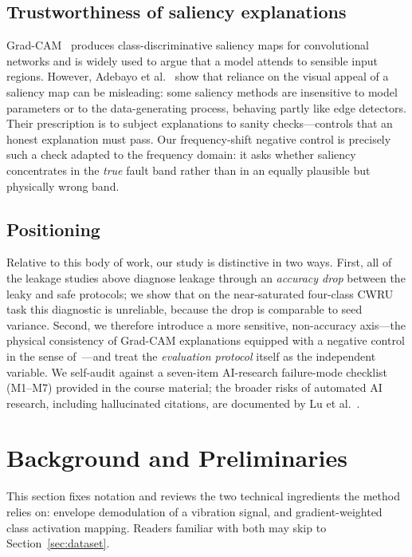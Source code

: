 \documentclass[11pt]{article}
\begin{document}
\subsection{Trustworthiness of saliency explanations}
Grad-CAM~\cite{selvaraju2017gradcam} produces class-discriminative saliency maps for
convolutional networks and is widely used to argue that a model attends to sensible input
regions. However, Adebayo et al.~\cite{adebayo2018sanity} show that reliance on the
visual appeal of a saliency map can be misleading: some saliency methods are insensitive
to model parameters or to the data-generating process, behaving partly like edge
detectors. Their prescription is to subject explanations to sanity checks---controls that
an honest explanation must pass. Our frequency-shift negative control is precisely such a
check adapted to the frequency domain: it asks whether saliency concentrates in the
\emph{true} fault band rather than in an equally plausible but physically wrong band.

\subsection{Positioning}
Relative to this body of work, our study is distinctive in two ways. First, all of the
leakage studies above diagnose leakage through an \emph{accuracy drop} between the leaky
and safe protocols; we show that on the near-saturated four-class CWRU task this
diagnostic is unreliable, because the drop is comparable to seed variance. Second, we
therefore introduce a more sensitive, non-accuracy axis---the physical consistency of
Grad-CAM explanations equipped with a negative control in the sense
of~\cite{adebayo2018sanity}---and treat the \emph{evaluation protocol} itself as the
independent variable. We self-audit against a seven-item AI-research failure-mode
checklist (M1--M7) provided in the course material; the broader risks of automated
AI research, including hallucinated citations, are documented by Lu et
al.~\cite{lu2026automation}.

\section{Background and Preliminaries}
This section fixes notation and reviews the two technical ingredients the method relies
on: envelope demodulation of a vibration signal, and gradient-weighted class activation
mapping. Readers familiar with both may skip to Section~\ref{sec:dataset}.
\end{document}
